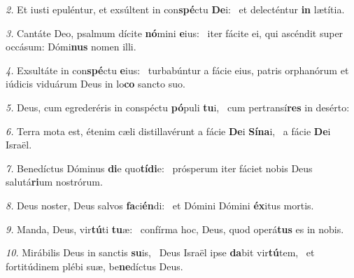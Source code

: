 \begin{psalmus}
\textit{\color{red}2.} Et iusti epuléntur, et exsúltent in con\textbf{spé}ctu \textbf{De}i:~\grestar{}
et delecténtur \textbf{in} lætítia.~\Abardot{}

\textit{\color{red}3.} Cantáte Deo, psalmum dícite \textbf{nó}mini \textbf{e}ius:~\grestar{}
iter fácite ei, qui ascéndit super occásum: Dómi\textbf{nus} nomen illi.~\Abardot{}

\textit{\color{red}4.} Exsultáte in con\textbf{spé}ctu \textbf{e}ius:~\grestar{}
turbabúntur a fácie eius, patris orphanórum et iúdicis viduárum Deus in lo\textbf{co} sancto suo.~\Abardot{}

\textit{\color{red}5.} Deus, cum egrederéris in conspéctu \textbf{pó}puli \textbf{tu}i,~\grestar{}
cum pertransí\textbf{res} in desérto:~\Abardot{}

\textit{\color{red}6.} Terra mota est, étenim cæli distillavérunt a fácie \textbf{De}i \textbf{Sí}\textbf{na}i,~\grestar{}
a fácie \textbf{De}i Israël.~\Abardot{}

\textit{\color{red}7.} Benedíctus Dóminus \textbf{di}e quo\textbf{tí}\textbf{di}e:~\grestar{}
prósperum iter fáciet nobis Deus salutá\textbf{ri}um nostrórum.~\Abardot{}

\textit{\color{red}8.} Deus noster, Deus salvos \textbf{fa}ci\textbf{én}di:~\grestar{}
et Dómini Dómini \textbf{éx}itus mortis.~\Abardot{}

\textit{\color{red}9.} Manda, Deus, vir\textbf{tú}ti \textbf{tu}æ:~\grestar{}
confírma hoc, Deus, quod operá\textbf{tus} es in nobis.~\Abardot{}

\textit{\color{red}10.} Mirábilis Deus in sanctis \textbf{su}is,~\gredagger{}
Deus Israël ipse \textbf{da}bit vir\textbf{tú}tem,~\grestar{}
et fortitúdinem plébi suæ, be\textbf{ne}díctus Deus.~\Abardot{}
\end{psalmus}
